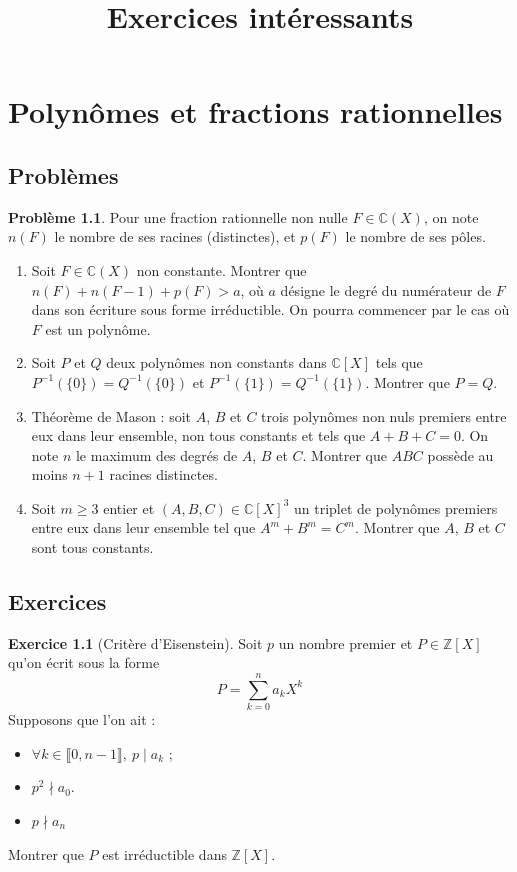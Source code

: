 \documentclass[french]{book}
\title{Exercices intéressants}
\newcommand{\Z}{\mathbb{Z}}
\newcommand{\C}{\mathbb{C}}
\newcommand{\inv}{^{-1}}
\theoremstyle{definition}
\newtheorem{ex}{Exercice}[chapter]
\newtheorem{pro}{Problème}[chapter]
\begin{document}
\chapter{Polynômes et fractions rationnelles}

\section{Problèmes}

\begin{pro}
	Pour une fraction rationnelle non nulle $F\in\C(X)$, on note $n(F)$ le nombre de ses racines (distinctes), et $p(F)$ le nombre de ses pôles.
	\begin{enumerate}
		\item Soit $F\in\C(X)$ non constante. Montrer que $n(F)+n(F-1)+p(F)>a$, où $a$ désigne le degré du numérateur de $F$ dans son écriture sous forme irréductible. On pourra commencer par le cas où $F$ est un polynôme.
		\item Soit $P$ et $Q$ deux polynômes non constants dans $\C[X]$ tels que $P\inv(\{0\})=Q\inv(\{0\})$ et $P\inv(\{1\})=Q\inv(\{1\})$. Montrer que $P=Q$.
		\item Théorème de Mason : soit $A$, $B$ et $C$ trois polynômes non nuls premiers entre eux dans leur ensemble, non tous constants et tels que $A+B+C=0$. On note $n$ le maximum des degrés de $A$, $B$ et $C$. Montrer que $ABC$ possède au moins $n+1$ racines distinctes.
		\item Soit $m\geqslant 3$ entier et $(A,B,C)\in\C[X]^3$ un triplet de polynômes premiers entre eux dans leur ensemble tel que $A^m+B^m=C^m$. Montrer que $A$, $B$ et $C$ sont tous constants.
	\end{enumerate}
\end{pro}

\section{Exercices}

\begin{ex}[Critère d'Eisenstein]
	Soit $p$ un nombre premier et $P\in\Z[X]$ qu'on écrit sous la forme $$P=\sum_{k=0}^{n}a_kX^k$$ Supposons que l'on ait :
	\begin{itemize}
		\item $\forall k\in\llbracket0,n-1\rrbracket,\ p\mid a_k$ ;
		\item $p^2\nmid a_0$.
		\item $p\nmid a_n$
	\end{itemize}
	Montrer que $P$ est irréductible dans $\Z[X]$.
\end{ex}
\end{document}
